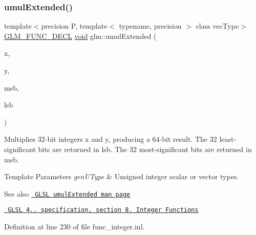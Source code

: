 \subsubsection{\texorpdfstring{umulExtended()}{umulExtended()}}
{\footnotesize\ttfamily template$<$precision P, template$<$ typename, precision $>$ class vec\+Type$>$ \\
\mbox{\hyperlink{setup_8hpp_ab2d052de21a70539923e9bcbf6e83a51}{G\+L\+M\+\_\+\+F\+U\+N\+C\+\_\+\+D\+E\+CL}} \mbox{\hyperlink{glad_8h_a950fc91edb4504f62f1c577bf4727c29}{void}} glm\+::umul\+Extended (\begin{DoxyParamCaption}\item[{vec\+Type$<$ \mbox{\hyperlink{group__core__precision_ga4fd29415871152bfb5abd588334147c8}{uint}}, P $>$ const \&}]{x,  }\item[{vec\+Type$<$ \mbox{\hyperlink{group__core__precision_ga4fd29415871152bfb5abd588334147c8}{uint}}, P $>$ const \&}]{y,  }\item[{vec\+Type$<$ \mbox{\hyperlink{group__core__precision_ga4fd29415871152bfb5abd588334147c8}{uint}}, P $>$ \&}]{msb,  }\item[{vec\+Type$<$ \mbox{\hyperlink{group__core__precision_ga4fd29415871152bfb5abd588334147c8}{uint}}, P $>$ \&}]{lsb }\end{DoxyParamCaption})}

Multiplies 32-\/bit integers x and y, producing a 64-\/bit result. The 32 least-\/significant bits are returned in lsb. The 32 most-\/significant bits are returned in msb.


\begin{DoxyTemplParams}{Template Parameters}
{\em gen\+U\+Type} & Unsigned integer scalar or vector types.\\
\hline
\end{DoxyTemplParams}
\begin{DoxySeeAlso}{See also}
\href{http://www.opengl.org/sdk/docs/manglsl/xhtml/umulExtended.xml}{\texttt{ G\+L\+SL umul\+Extended man page}} 

\href{http://www.opengl.org/registry/doc/GLSLangSpec.4.20.8.pdf}{\texttt{ G\+L\+SL 4.. specification, section 8. Integer Functions}} 
\end{DoxySeeAlso}


Definition at line 230 of file func\+\_\+integer.\+inl.

\mbox{\label{group__core__func__integer_ga22a889bf08313b7e547e2cdb8bb15ee4}} 
